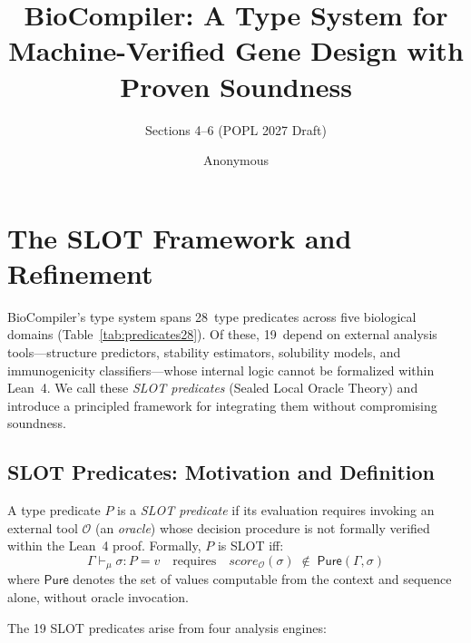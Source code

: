 \documentclass[sigplan,10pt,manuscript,review,anonymous]{acmart}
\title{BioCompiler: A Type System for Machine-Verified Gene Design with Proven Soundness}
\subtitle{Sections 4--6 (POPL 2027 Draft)}
\author{Anonymous}
\institute{Anonymous Institution}
\newcommand{\seq}{\sigma}
\newcommand{\pred}{P}
\newcommand{\verdict}{v}
\newcommand{\mode}{\mu}
\newcommand{\score}{\mathit{score}}
\newcommand{\evalmode}[4]{#1 \vdash_{#2} #3 : #4}
\begin{document}
\maketitle

\section{The SLOT Framework and Refinement}\label{sec:slot}

BioCompiler's type system spans 28~type predicates across five
biological domains (Table~\ref{tab:predicates28}).
Of these, 19~depend on external analysis tools---structure predictors,
stability estimators, solubility models, and immunogenicity
classifiers---whose internal logic cannot be formalized within Lean~4.
We call these \emph{SLOT predicates} (Sealed Local Oracle Theory) and
introduce a principled framework for integrating them without
compromising soundness.

\subsection{SLOT Predicates: Motivation and Definition}\label{sec:slot-def}

\begin{definition}
A type predicate $\pred$ is a \emph{SLOT predicate} if its evaluation
requires invoking an external tool $\mathcal{O}$ (an \emph{oracle})
whose decision procedure is not formally verified within the Lean~4
proof. Formally, $\pred$ is SLOT iff:
\[
  \evalmode{\Gamma}{\mode}{\seq}{\pred} = \verdict
  \quad\text{requires}\quad
  \score_{\mathcal{O}}(\seq) \;\notin\; \mathsf{Pure}(\Gamma, \seq)
\]
where $\mathsf{Pure}$ denotes the set of values computable from the
context and sequence alone, without oracle invocation.
\end{definition}

The 19 SLOT predicates arise from four analysis engines:
\end{document}
